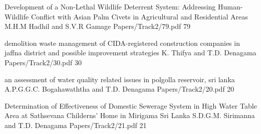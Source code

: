         

        

        
         \addpaper
    	{Development of a Non-Lethal Wildlife Deterrent System: Addressing Human-Wildlife Conflict with Asian Palm Civets in Agricultural and Residential Areas}
   		 {M.H.M Hadhil and S.V.R Gamage} 
   		 {Papers/Track2/79.pdf}
        {79} 

        

        

        

        

        

        
     
         \addpaper
    	{demolition waste management of CIDA-registered construction companies in jaffna district and possible improvement strategies}
   		 {K. Thifya and T.D. Denagama} 
   		 {Papers/Track2/30.pdf}
        {30} 

        \addpaper
    	{an assessment of water quality related issues in polgolla reservoir, sri lanka}
   		 {A.P.G.G.C. Bogahawaththa and T.D. Denagama} 
   		 {Papers/Track2/20.pdf}
        {20}

        \addpaper
    	{Determination of Effectiveness of Domestic Sewerage System in High Water Table Area at Sathsevana Childerns' Home in Mirigama Sri Lanka}
   		 {S.D.G.M. Sirimanna and T.D. Denagama} 
   		 {Papers/Track2/21.pdf}
        {21}